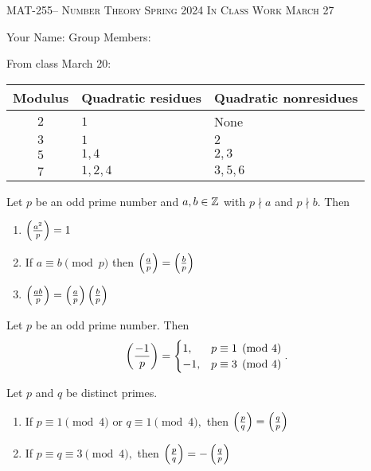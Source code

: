 \documentclass[handout]{ximera}
\date{March 27, 2024}
\begin{document}
\handoutAbstract
\maketitle
 	\begin{center}%
    	{\large \scshape MAT-255-- Number Theory 
			\hfill Spring 2024 
			\hfill In Class Work March 27}%
    
		{\large Your Name: \hrulefill \quad 
			Group Members:\hrulefill \quad 
			\hrulefill
			\par}%
 	\end{center}%
	 
From class March 20:

\begin{tabular}{cll}
	Modulus & Quadratic residues & Quadratic nonresidues\\\hline
	$2$	& $1$ 	& None\\
	$3$	& $1$	& $2$\\
	$5$	& $1,4$	& $2,3$\\
	$7$	& $1,2,4$	& $3,5,6$
\end{tabular}

\begin{proposition}[Proposition 4.5]
	Let $p$ be an odd prime number and $a,b\in\mathbb Z$ with $p\nmid a$ and $p\nmid b.$ Then 
	\begin{enumerate}[label=(\alph*)]
		\item $\left(\frac{a^2}{p}\right)=1$ \label{squares-are-square}
		\item If $a\equiv b\pmod{p}$ then $\left(\frac{a}{p}\right)=\left(\frac{b}{p}\right)$ \label{legendre-respects-mod}
		\item $\left(\frac{ab}{p}\right)=\left(\frac{a}{p}\right)\left(\frac{b}{p}\right)$ \label{legendre-mult}
	\end{enumerate}
\end{proposition}

\begin{theorem}[Theorem 4.6]\label{thm:residue-neg1}
	Let $p$ be an odd prime number. Then 
	\[
		\left(\frac{-1}{p}\right)=
			\begin{cases}
 				1, & p\equiv 1\pmod{4}\\
				-1, & p\equiv 3\pmod{4}
			\end{cases}.
	\]
\end{theorem}

\begin{theorem}\label{quad-rec}
	Let $p$ and $q$ be distinct primes.  
	\begin{enumerate}[label=(\alph*)]
		\item If $p\equiv 1 \pmod{4}$ or $q\equiv 1\pmod{4},$ then $\left(\frac{p}{q}\right)=\left(\frac{q}{p}\right)$
 		\item If $p\equiv q \equiv 3 \pmod{4},$ then $\left(\frac{p}{q}\right)=-\left(\frac{q}{p}\right)$
	\end{enumerate}
\end{theorem}
\end{document}
